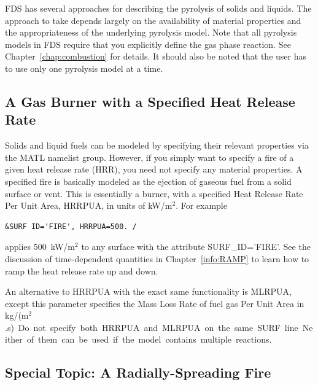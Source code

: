 \documentclass[11pt]{book}
\begin{document}
FDS has several approaches for describing the pyrolysis of solids and liquids. The approach to take depends largely
on the availability of material properties and the appropriateness of the underlying pyrolysis model.
Note that all pyrolysis models in FDS require that you explicitly define the gas phase reaction. See Chapter~\ref{chap:combustion} for details.
It should also be noted that the user has to use only one pyrolysis model at a time.

\subsection{A Gas Burner with a Specified Heat Release Rate}

\label{info:gas_burner}

Solids and liquid fuels can be modeled by specifying their relevant
properties via the {\ct MATL} namelist group. However, if you simply
want to specify a fire of a given heat release rate (HRR),
you need not specify any material properties. A specified fire is
basically modeled as the ejection of gaseous fuel
from a solid surface or vent. This is essentially a burner, with a
specified Heat Release Rate Per Unit Area, {\ct HRRPUA}, in units of
kW/m$^2$. For example
\begin{lstlisting}
&SURF ID='FIRE', HRRPUA=500. /
\end{lstlisting}
applies 500~kW/m$^2$ to any surface with the attribute
{\ct SURF\_ID='FIRE'}. See the discussion of time-dependent quantities
in Chapter~\ref{info:RAMP} to learn how to ramp the heat release rate up and down.

An alternative to {\ct HRRPUA} with the exact same functionality is {\ct MLRPUA}, except this parameter
specifies the Mass Loss Rate of fuel gas Per Unit Area in \si{kg/(m$^2$.s)}. Do not specify both
{\ct HRRPUA} and {\ct MLRPUA} on the same {\ct SURF} line.  Neither of them can be used if the model contains multiple reactions.







\subsection{Special Topic: A Radially-Spreading Fire}
\label{info:spread}
\end{document}
